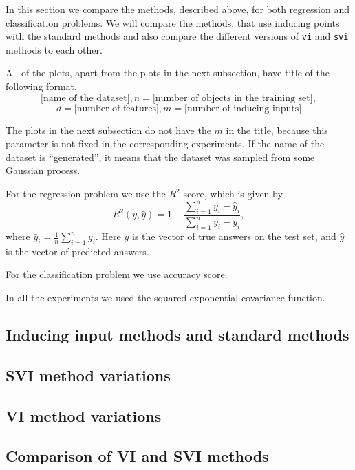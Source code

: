 In this section we compare the methods, described above, for both regression and classification problems. We will compare the methods, that use inducing points with the standard methods and also compare the different versions of \lstinline{vi} and \lstinline{svi} methods to each other.

All of the plots, apart from the plots in the next subsection, have title of the following format.
$$\mbox{[name of the dataset]}, n = \mbox{[number of objects in the training set]},$$
$$d = \mbox{[number of features]}, m = \mbox{[number of inducing inputs]}$$

The plots in the next subsection do not have the $m$ in the title, because this parameter is not fixed in the corresponding experiments. If the name of the dataset is ``generated'', it means that the dataset was sampled from some Gaussian process.

For the regression problem we use the $R^2$ score, which is given by
$$R^2(y, \hat y) = 1 - \frac{\sum_{i = 1}^{n} y_i - \hat y_i}{\sum_{i = 1}^{n} y_i - \bar y_i},$$
where $\bar y_i = \frac 1 n \sum_{i = 1}^n y_i$. Here $y$ is the vector of true answers on the test set, and $\hat y$ is the vector of predicted answers.

For the classification problem we use accuracy score.

In all the experiments we used the squared exponential covariance function. 

\subsection{Inducing input methods and standard methods}
	
\subsection{SVI method variations}
	
\subsection{VI method variations}
	
\subsection{Comparison of VI and SVI methods}
	